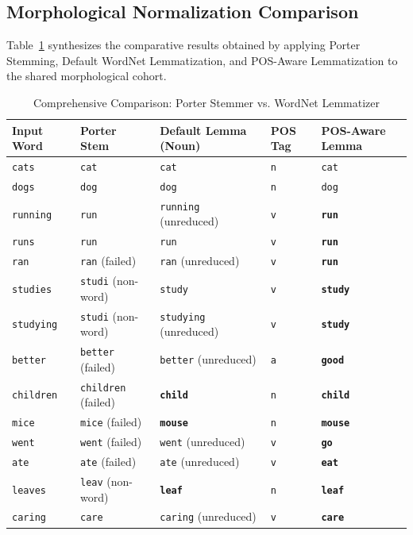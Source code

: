\documentclass[12pt,a4paper]{report}
\begin{document}
\subsection{Morphological Normalization Comparison}
Table~\ref{tab:exp3_morph_comparison} synthesizes the comparative results obtained by applying Porter Stemming, Default WordNet Lemmatization, and POS-Aware Lemmatization to the shared morphological cohort.
\begin{table}[H]
\centering
\small
\caption{Comprehensive Comparison: Porter Stemmer vs. WordNet Lemmatizer}
\label{tab:exp3_morph_comparison}
\begin{tabular}{lllll}
\toprule
\textbf{Input Word} & \textbf{Porter Stem} & \textbf{Default Lemma (Noun)} & \textbf{POS Tag} & \textbf{POS-Aware Lemma} \\
\midrule
\texttt{cats} & \texttt{cat} & \texttt{cat} & \texttt{n} & \texttt{cat} \\
\texttt{dogs} & \texttt{dog} & \texttt{dog} & \texttt{n} & \texttt{dog} \\
\texttt{running} & \texttt{run} & \texttt{running} (unreduced) & \texttt{v} & \textbf{\texttt{run}} \\
\texttt{runs} & \texttt{run} & \texttt{run} & \texttt{v} & \textbf{\texttt{run}} \\
\texttt{ran} & \texttt{ran} (failed) & \texttt{ran} (unreduced) & \texttt{v} & \textbf{\texttt{run}} \\
\texttt{studies} & \texttt{studi} (non-word) & \texttt{study} & \texttt{v} & \textbf{\texttt{study}} \\
\texttt{studying} & \texttt{studi} (non-word) & \texttt{studying} (unreduced) & \texttt{v} & \textbf{\texttt{study}} \\
\texttt{better} & \texttt{better} (failed) & \texttt{better} (unreduced) & \texttt{a} & \textbf{\texttt{good}} \\
\texttt{children} & \texttt{children} (failed) & \textbf{\texttt{child}} & \texttt{n} & \textbf{\texttt{child}} \\
\texttt{mice} & \texttt{mice} (failed) & \textbf{\texttt{mouse}} & \texttt{n} & \textbf{\texttt{mouse}} \\
\texttt{went} & \texttt{went} (failed) & \texttt{went} (unreduced) & \texttt{v} & \textbf{\texttt{go}} \\
\texttt{ate} & \texttt{ate} (failed) & \texttt{ate} (unreduced) & \texttt{v} & \textbf{\texttt{eat}} \\
\texttt{leaves} & \texttt{leav} (non-word) & \textbf{\texttt{leaf}} & \texttt{n} & \textbf{\texttt{leaf}} \\
\texttt{caring} & \texttt{care} & \texttt{caring} (unreduced) & \texttt{v} & \textbf{\texttt{care}} \\
\bottomrule
\end{tabular}
\end{table}
\end{document}
